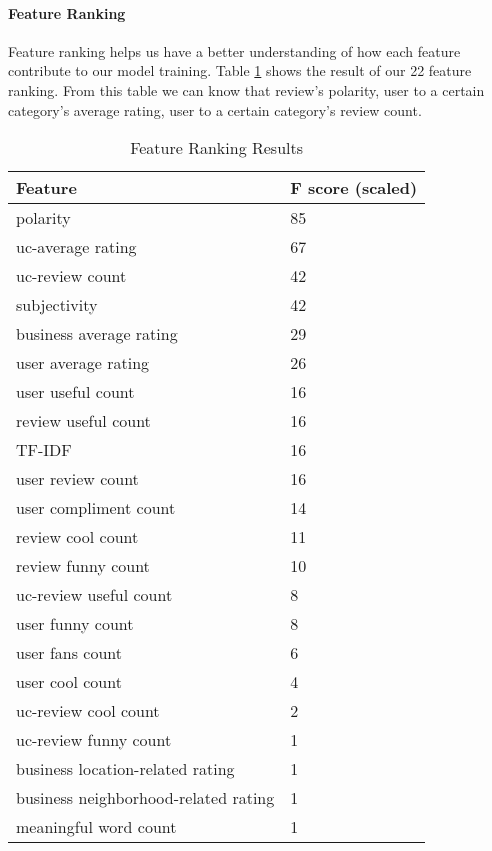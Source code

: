 \paragraph{Feature Ranking}
Feature ranking helps us have a better understanding of how each feature contribute to our model training. Table \ref{tb:ranking} shows the result of our 22 feature ranking. From this table we can know that review's polarity, user to a certain category's average rating, user to a certain category's review count.

\begin{table}[h]
	\small
	\caption{Feature Ranking Results}
	\label{tb:ranking}
	\begin{tabular}{l|l}
		\hline
		\textbf{Feature}                          & \textbf{F score (scaled)}                                                                \\ \hline
		polarity     & 85                       \\ \hline
		uc-average rating      & 67                        \\ \hline
		uc-review count & 42\\ \hline
		subjectivity & 42\\ \hline
		business average rating & 29\\ \hline
		user average rating & 26\\ \hline
		user useful count & 16\\ \hline
		review useful count     & 16                       \\ \hline
		TF-IDF      & 16                        \\ \hline
		user review count & 16\\ \hline
		user compliment count & 14\\ \hline
		review cool count & 11\\ \hline
		review funny count & 10\\ \hline
		uc-review useful count& 8\\ \hline
		user funny count & 8\\ \hline
		user fans count     & 6                       \\ \hline
		user cool count      & 4                        \\ \hline
		uc-review cool count & 2\\ \hline
		uc-review funny count & 1\\ \hline
		business location-related rating & 1\\ \hline
		business neighborhood-related rating & 1\\ \hline
		meaningful word count& 1\\

	\end{tabular}
\end{table}

